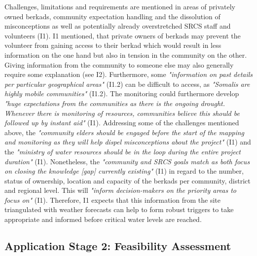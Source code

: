 Challenges, limitations and requirements are mentioned in areas of privately owned berkads, community expectation handling and the dissolution of misconceptions as well as potentially already overstretched SRCS staff and volunteers (I1). I1 mentioned, that private owners of berkads may prevent the volunteer from gaining access to their berkad which would result in less information on the one hand but also in tension in the community on the other. Giving information from the community to someone else may also generally require some explanation (see I2). Furthermore, some \textit{"information on past details per particular geographical areas"} (I1.2) can be difficult to access, as \textit{"Somalis are highly mobile communities"} (I1.2). The monitoring could furthermore develop \textit{"huge expectations from the communities as there is the ongoing drought. Whenever there is monitoring of resources, communities believe this should be followed up by instant aid"} (I1).\newline
Addressing some of the challenges mentioned above, the \textit{"community elders should be engaged before the start of the mapping and monitoring as they will help dispel misconceptions about the project"} (I1) and the \textit{"ministry of water resources should be in the loop during the entire project duration"} (I1). Nonetheless, the \textit{"community and SRCS goals match as both focus on closing the knowledge [gap] currently existing"} (I1) in regard to the number, status of ownership, location and capacity of the berkads per community, district and regional level. This will \textit{"inform decision-makers on the priority areas to focus on"} (I1). Therefore, I1 expects that this information from the site triangulated with weather forecasts can help to form robust triggers to take appropriate and informed  before critical water levels are reached.

\subsection{Application Stage 2: Feasibility Assessment}\label{subsec:stage2_appl}

